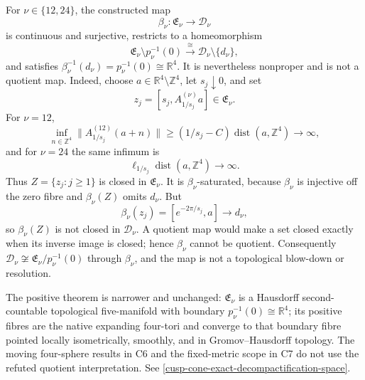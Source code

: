 \begin{auditrecord}
\Refuted For \(\nu\in\{12,24\}\), the constructed map
\[
 \beta_\nu:\mathfrak E_\nu\longrightarrow\mathcal D_\nu
\]
is continuous and surjective, restricts to a homeomorphism
\[
 \mathfrak E_\nu\setminus p_\nu^{-1}(0)
 \xrightarrow{\ \cong\ }
 \mathcal D_\nu\setminus\{d_\nu\},
\]
and satisfies
\(\beta_\nu^{-1}(d_\nu)=p_\nu^{-1}(0)\cong\mathbb R^4\).
It is nevertheless nonproper and is not a quotient map.  Indeed, choose
\(a\in\mathbb R^4\setminus\mathbb Z^4\), let \(s_j\downarrow0\), and set
\[
 z_j=[s_j,A_{1/s_j}^{(\nu)}a]\in\mathfrak E_\nu.
\]
For \(\nu=12\),
\[
 \inf_{n\in\mathbb Z^4}
 \|A_{1/s_j}^{(12)}(a+n)\|
 \geq(1/s_j-C)\operatorname{dist}(a,\mathbb Z^4)\longrightarrow\infty,
\]
and for \(\nu=24\) the same infimum is
\[
 \ell_{1/s_j}\operatorname{dist}(a,\mathbb Z^4)\longrightarrow\infty.
\]
Thus \(Z=\{z_j:j\geq1\}\) is closed in \(\mathfrak E_\nu\).  It is
\(\beta_\nu\)-saturated, because \(\beta_\nu\) is injective off the zero
fibre and \(\beta_\nu(Z)\) omits \(d_\nu\).  But
\[
 \beta_\nu(z_j)=[e^{-2\pi/s_j},a]\longrightarrow d_\nu,
\]
so \(\beta_\nu(Z)\) is not closed in \(\mathcal D_\nu\).  A quotient map
would make a set closed exactly when its inverse image is closed; hence
\(\beta_\nu\) cannot be quotient.  Consequently
\(\mathcal D_\nu\not\cong
\mathfrak E_\nu/p_\nu^{-1}(0)\) through \(\beta_\nu\), and the map is not a
topological blow-down or resolution.

The positive theorem is narrower and unchanged: \(\mathfrak E_\nu\) is a
Hausdorff second-countable topological five-manifold with boundary
\(p_\nu^{-1}(0)\cong\mathbb R^4\); its positive fibres are the native
expanding four-tori and converge to that boundary fibre pointed locally
isometrically, smoothly, and in Gromov--Hausdorff topology.  The moving
four-sphere results in C6 and the fixed-metric scope in C7 do not use the
refuted quotient interpretation.  See
\cref{cusp-cone-exact-decompactification-space}.
\end{auditrecord}

